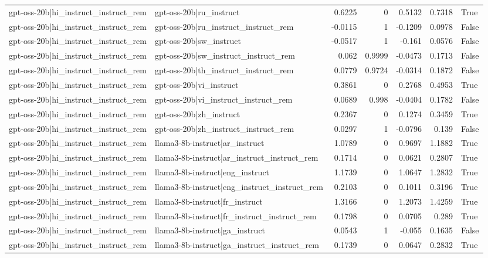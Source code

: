 \begin{table}
\begin{tabular}{l l r r r r l}
gpt-oss-20b|hi_instruct_instruct_rem & gpt-oss-20b|ru_instruct & 0.6225 & 0 & 0.5132 & 0.7318 & True \\
gpt-oss-20b|hi_instruct_instruct_rem & gpt-oss-20b|ru_instruct_instruct_rem & -0.0115 & 1 & -0.1209 & 0.0978 & False \\
gpt-oss-20b|hi_instruct_instruct_rem & gpt-oss-20b|sw_instruct & -0.0517 & 1 & -0.161 & 0.0576 & False \\
gpt-oss-20b|hi_instruct_instruct_rem & gpt-oss-20b|sw_instruct_instruct_rem & 0.062 & 0.9999 & -0.0473 & 0.1713 & False \\
gpt-oss-20b|hi_instruct_instruct_rem & gpt-oss-20b|th_instruct_instruct_rem & 0.0779 & 0.9724 & -0.0314 & 0.1872 & False \\
gpt-oss-20b|hi_instruct_instruct_rem & gpt-oss-20b|vi_instruct & 0.3861 & 0 & 0.2768 & 0.4953 & True \\
gpt-oss-20b|hi_instruct_instruct_rem & gpt-oss-20b|vi_instruct_instruct_rem & 0.0689 & 0.998 & -0.0404 & 0.1782 & False \\
gpt-oss-20b|hi_instruct_instruct_rem & gpt-oss-20b|zh_instruct & 0.2367 & 0 & 0.1274 & 0.3459 & True \\
gpt-oss-20b|hi_instruct_instruct_rem & gpt-oss-20b|zh_instruct_instruct_rem & 0.0297 & 1 & -0.0796 & 0.139 & False \\
gpt-oss-20b|hi_instruct_instruct_rem & llama3-8b-instruct|ar_instruct & 1.0789 & 0 & 0.9697 & 1.1882 & True \\
gpt-oss-20b|hi_instruct_instruct_rem & llama3-8b-instruct|ar_instruct_instruct_rem & 0.1714 & 0 & 0.0621 & 0.2807 & True \\
gpt-oss-20b|hi_instruct_instruct_rem & llama3-8b-instruct|eng_instruct & 1.1739 & 0 & 1.0647 & 1.2832 & True \\
gpt-oss-20b|hi_instruct_instruct_rem & llama3-8b-instruct|eng_instruct_instruct_rem & 0.2103 & 0 & 0.1011 & 0.3196 & True \\
gpt-oss-20b|hi_instruct_instruct_rem & llama3-8b-instruct|fr_instruct & 1.3166 & 0 & 1.2073 & 1.4259 & True \\
gpt-oss-20b|hi_instruct_instruct_rem & llama3-8b-instruct|fr_instruct_instruct_rem & 0.1798 & 0 & 0.0705 & 0.289 & True \\
gpt-oss-20b|hi_instruct_instruct_rem & llama3-8b-instruct|ga_instruct & 0.0543 & 1 & -0.055 & 0.1635 & False \\
gpt-oss-20b|hi_instruct_instruct_rem & llama3-8b-instruct|ga_instruct_instruct_rem & 0.1739 & 0 & 0.0647 & 0.2832 & True \\

\end{tabular}
\end{table}
